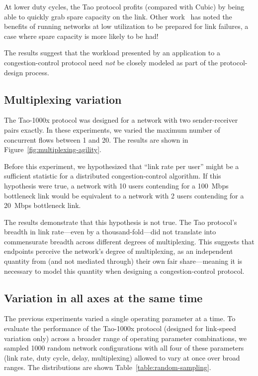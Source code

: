 At lower duty cycles, the Tao protocol profits (compared with Cubic)
by being able to quickly grab spare capacity on the link. Other
work~\cite{nwksleep, sprintip, linkoverload} has noted the benefits of
running networks at low utilization to be prepared for link
failures, a case where spare capacity is more likely to be had!

The results suggest that the workload presented by an application to a
congestion-control protocol need \emph{not} be closely modeled as part
of the protocol-design process.

\subsection{Multiplexing variation}

The Tao-1000x protocol was designed for a network with two sender-receiver
pairs exactly. In these experiments, we varied the maximum number of
concurrent flows between 1 and 20. The results are shown in
Figure~\ref{fig:multiplexing-agility}.

Before this experiment, we hypothesized that ``link rate per user''
might be a sufficient statistic for a distributed congestion-control
algorithm. If this hypothesis were true, a network with 10 users
contending for a 100~Mbps bottleneck link would be equivalent to a
network with 2 users contending for a 20~Mbps bottleneck link.

The results demonstrate that this hypothesis is not true. The Tao
protocol's breadth in link rate---even by a thousand-fold---did not
translate into commensurate breadth across different degrees of
multiplexing. This suggests that endpoints perceive the network's
degree of multiplexing, as an independent quantity from (and not
mediated through) their own fair share---meaning it is necessary to
model this quantity when designing a congestion-control protocol.


\subsection{Variation in all axes at the same time}

The previous experiments varied a single operating parameter at a
time. To evaluate the performance of the Tao-1000x protocol (designed for
link-speed variation only) across a broader range of operating
parameter combinations, we sampled 1000 random network configurations
with all four of these parameters (link rate, duty cycle, delay,
multiplexing) allowed to vary at once over broad ranges. The
distributions are shown Table~\ref{table:random-sampling}.


